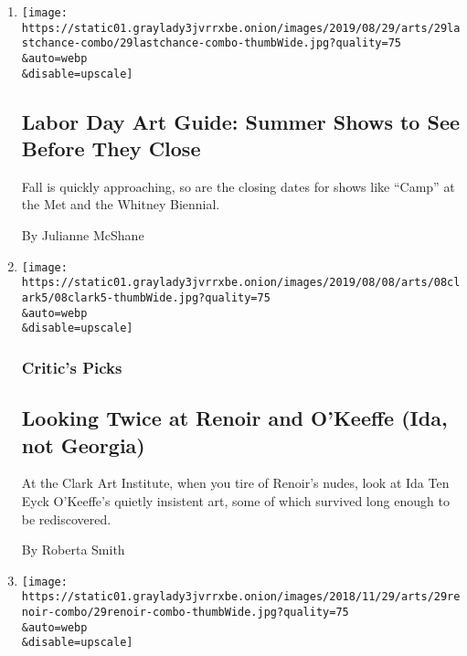 \begin{enumerate}
\def\labelenumi{\arabic{enumi}.}
\item
  \href{/2019/08/29/arts/design/labor-day-art-guide.html}{}

  \texttt{[image: https://static01.graylady3jvrrxbe.onion/images/2019/08/29/arts/29lastchance-combo/29lastchance-combo-thumbWide.jpg?quality=75\\\&auto=webp\\\&disable=upscale]}

  \hypertarget{labor-day-art-guide-summer-shows-to-see-before-they-close}{%
  \subsection{Labor Day Art Guide: Summer Shows to See Before They
  Close}\label{labor-day-art-guide-summer-shows-to-see-before-they-close}}

  Fall is quickly approaching, so are the closing dates for shows like
  ``Camp'' at the Met and the Whitney Biennial.

  By Julianne McShane
\item
  \href{/2019/08/08/arts/design/renoir-ida-okeeffe-clark-art-institute.html}{}

  \texttt{[image: https://static01.graylady3jvrrxbe.onion/images/2019/08/08/arts/08clark5/08clark5-thumbWide.jpg?quality=75\\\&auto=webp\\\&disable=upscale]}

  \hypertarget{critics-picks}{%
  \subsubsection{Critic's Picks}\label{critics-picks}}

  \hypertarget{looking-twice-at-renoir-and-okeeffe-ida-not-georgia}{%
  \subsection{Looking Twice at Renoir and O'Keeffe (Ida, not
  Georgia)}\label{looking-twice-at-renoir-and-okeeffe-ida-not-georgia}}

  At the Clark Art Institute, when you tire of Renoir's nudes, look at
  Ida Ten Eyck O'Keeffe's quietly insistent art, some of which survived
  long enough to be rediscovered.

  By Roberta Smith
\item
  \href{/2018/11/28/arts/design/renoir-stolen-auction-austria.html}{}

  \texttt{[image: https://static01.graylady3jvrrxbe.onion/images/2018/11/29/arts/29renoir-combo/29renoir-combo-thumbWide.jpg?quality=75\\\&auto=webp\\\&disable=upscale]}


\end{enumerate}
